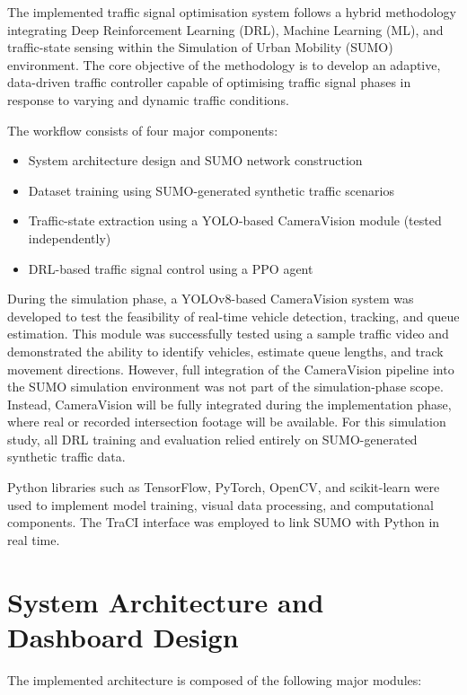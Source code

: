 \documentclass[11pt, a4paper]{report}
\begin{document}
The implemented traffic signal optimisation system follows a hybrid methodology integrating Deep Reinforcement Learning (DRL), Machine Learning (ML), and traffic-state sensing within the Simulation of Urban Mobility (SUMO) environment. The core objective of the methodology is to develop an adaptive, data-driven traffic controller capable of optimising traffic signal phases in response to varying and dynamic traffic conditions.

The workflow consists of four major components:

\begin{itemize}
    \item System architecture design and SUMO network construction
    \item Dataset training using SUMO-generated synthetic traffic scenarios
    \item Traffic-state extraction using a YOLO-based CameraVision module (tested independently)
    \item DRL-based traffic signal control using a PPO agent
\end{itemize}

During the simulation phase, a YOLOv8-based CameraVision system was developed to test the feasibility of real-time vehicle detection, tracking, and queue estimation. This module was successfully tested using a sample traffic video and demonstrated the ability to identify vehicles, estimate queue lengths, and track movement directions. However, full integration of the CameraVision pipeline into the SUMO simulation environment was not part of the simulation-phase scope. Instead, CameraVision will be fully integrated during the implementation phase, where real or recorded intersection footage will be available. For this simulation study, all DRL training and evaluation relied entirely on SUMO-generated synthetic traffic data.

Python libraries such as TensorFlow, PyTorch, OpenCV, and scikit-learn were used to implement model training, visual data processing, and computational components. The TraCI interface was employed to link SUMO with Python in real time.



\section{System Architecture and Dashboard Design}

The implemented architecture is composed of the following major modules:
\end{document}
